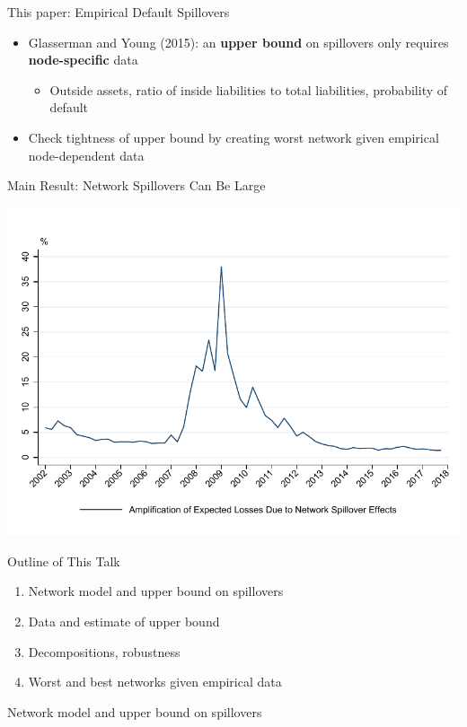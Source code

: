 \documentclass[12pt,envcountsect, leqno,xcolor=dvipsnames]{beamer}
\newcommand{\bi}{\begin{itemize}}
\newcommand{\ei}{\end{itemize}}
\newcommand{\bn}{\begin{enumerate}}
\newcommand{\en}{\end{enumerate}}
\begin{document}
\begin{frame}{This paper: Empirical Default Spillovers} 
\bi
\item Glasserman and Young (2015): an \textbf{upper bound} on spillovers only requires \textbf{node-specific} data
	\bi
	\item Outside assets, ratio of inside liabilities to total liabilities, probability of default
	\ei
\item Check tightness of upper bound by creating worst network given empirical node-dependent data
\ei
\end{frame}

\begin{frame}{Main Result: Network Spillovers Can Be Large}
\begin{center}
\includegraphics[width=\linewidth, height=0.8\textheight,keepaspectratio]{../output/NVI_benchmark.pdf}
\end{center}

\end{frame}

\begin{frame}{Outline of This Talk} 
\bn
\item Network model and upper bound on spillovers
\item Data and estimate of upper bound
\item Decompositions, robustness
\item Worst and best networks given empirical data
\en
\end{frame}

\begin{frame}

{\Large Network model and upper bound on spillovers}

\end{frame}
\end{document}
